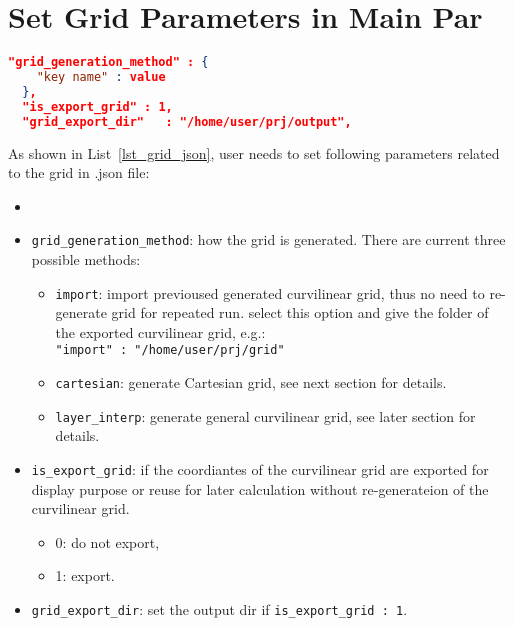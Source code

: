 \section{Set Grid Parameters in Main Par} \label{sec_grid_json} 

\begin{lstlisting}[language=json,
 caption=Grid related parameters in .json,
 label={lst_grid_json},
 frame=tb]
  "grid_generation_method" : {
    "key name" : value
  },
  "is_export_grid" : 1,
  "grid_export_dir"   : "/home/user/prj/output",               
\end{lstlisting}

As shown in List~\ref{lst_grid_json}, user needs to set following parameters
related to the grid in .json file:
\begin{itemize}
  \item \item \verb|grid_generation_method|: how the grid is generated.
    There are current three possible methods:

    \begin{itemize}
      \item \verb|import|: import previoused generated curvilinear grid, 
        thus no need to re-generate grid for repeated run. 
        select this option and give the folder of the exported curvilinear grid, e.g.:  \\
        \verb|"import" : "/home/user/prj/grid"| 

      \item \verb|cartesian|: generate Cartesian grid, see next section for details.

      \item \verb|layer_interp|: generate general curvilinear grid, see later section for details.
    \end{itemize}

  \item \verb|is_export_grid|: if the coordiantes of the curvilinear grid are exported 
         for display purpose or reuse for later calculation without re-generateion of the curvilinear grid.
      \begin{itemize}
        \item 0: do not export,
        \item 1: export.
      \end{itemize}

  \item \verb|grid_export_dir|: set the output dir if \verb|is_export_grid : 1|.
\end{itemize}

